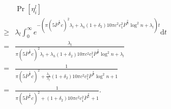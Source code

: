 \documentclass[english]{IEEEtran}
\theoremstyle{plain}
\theoremstyle{plain}
\theoremstyle{plain}
\theoremstyle{remark}
\begin{document}
\begin{eqnarray}
 &  & \Pr\left[\eta_{i}^{l}\right]\nonumber \\
 & \geq & \lambda_{l}\int_{0}^{\infty}e^{-\left(\pi\left(5\bar{P}^{\frac{1}{\alpha}}c\right)^{2}\lambda_{l}+\lambda_{h}\left(1+\delta_{2}\right)10\pi c^{2}c_{1}^{2}\bar{P}^{\frac{2}{\alpha}}\log^{2}n+\lambda_{l}\right)t}\mathrm{d}t\nonumber \\
 & = & \frac{\lambda_{l}}{\pi\left(5\bar{P}^{\frac{1}{\alpha}}c\right)^{2}\lambda_{l}+\lambda_{h}\left(1+\delta_{2}\right)10\pi c^{2}c_{1}^{2}\bar{P}^{\frac{2}{\alpha}}\log^{2}n+\lambda_{l}}\nonumber \\
 & = & \frac{1}{\pi\left(5\bar{P}^{\frac{1}{\alpha}}c\right)^{2}+\frac{\lambda_{h}}{\lambda_{l}}\left(1+\delta_{2}\right)10\pi c^{2}c_{1}^{2}\bar{P}^{\frac{2}{\alpha}}\log^{2}n+1}\nonumber \\
 & = & \frac{1}{\pi\left(5\bar{P}^{\frac{1}{\alpha}}c\right)^{2}+\left(1+\delta_{2}\right)10\pi c^{2}c_{1}^{2}\bar{P}^{\frac{2}{\alpha}}+1}.\label{eq:transmission opportunities of low power links}
\end{eqnarray}
\end{document}
